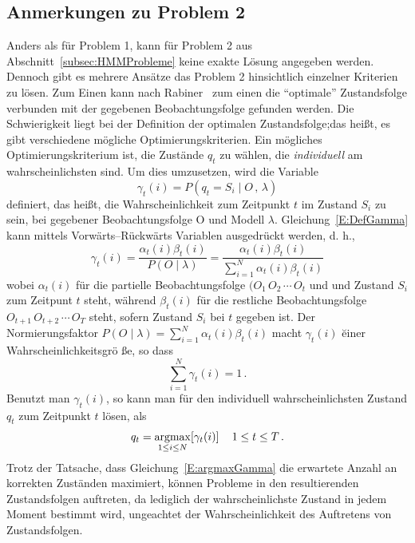 \subsection{Anmerkungen zu Problem 2}
Anders als f\"ur Problem 1, kann f\"ur Problem 2 aus Abschnitt~\ref{subsec:HMMProbleme} keine exakte L\"osung angegeben werden. Dennoch gibt es mehrere Ans\"atze das Problem 2 hinsichtlich einzelner Kriterien zu l\"osen. Zum Einen kann nach Rabiner~\cite{bib:hmmrabiner} zum einen die \enquote{optimale} Zustandsfolge verbunden mit der gegebenen Beobachtungsfolge gefunden werden. Die Schwierigkeit liegt bei der Definition der optimalen Zustandsfolge;das hei\ss t, es gibt verschiedene m\"ogliche Optimierungskriterien. Ein m\"ogliches Optimierungskriterium ist, die Zust\"ande $q_t$ zu w\"ahlen, die \textit{individuell} am wahrscheinlichsten sind. Um dies umzusetzen, wird die Variable
\begin{equation}
\label{E:DefGamma}
\gamma_t(i) = P (q_t = S_i \mid O \, , \, \lambda)
\end{equation}
definiert, das hei\ss t, die Wahrscheinlichkeit zum Zeitpunkt $t$ im Zustand $S_i$ zu sein, bei gegebener Beobachtungsfolge O und Modell $\lambda$. Gleichung~\ref{E:DefGamma} kann mittels Vorw\"arts--R\"uckw\"arts Variablen ausgedr\"uckt werden, d. h.,
\begin{equation}
\label{E:FracGamma}
\gamma_t(i) = \frac{\alpha_t(i) \beta_t(i)}{P (O  \mid \lambda)} = \frac{\alpha_t(i) \beta_t(i)}{\sum_{i = 1}^{N} \alpha_t(i) \beta_t(i)}
\end{equation}
wobei $\alpha_t(i)$ f\"ur die partielle Beobachtungsfolge $(O_1 \, O_2 \, \cdots \, O_t$  und  und Zustand $S_i$ zum Zeitpunt $t$ steht, w\"ahrend $\beta_t(i)$ f\"ur die restliche Beobachtungsfolge $O_{t +1} \, O_{t + 2} \, \cdots \, O_T$ steht, sofern Zustand $S_i$ bei $t$ gegeben ist. Der Normierungsfaktor $P (O  \mid \lambda) = \sum_{i = 1}^{N} \alpha_t(i) \beta_t(i)$ macht $\gamma_t(i)$ \u einer Wahrscheinlichkeitsgr\"o \ss e, so dass 
\begin{equation}
\sum_{i = 1}^{N} \gamma_t(i) = 1 \, .
\end{equation}
Benutzt man $ \gamma_t(i)$, so kann man f\"ur den individuell wahrscheinlichsten Zustand $q_t$ zum Zeitpunkt $t$ l\"osen, als
\begin{align}
\label{E:argmaxGamma}
q_t =  \underset{1 \leq i \leq N}{\operatorname*{argmax}} [\gamma_t(i)] \, & & 1 \leq t \leq T \, .
\end{align}
Trotz der Tatsache, dass Gleichung~\ref{E:argmaxGamma} die erwartete Anzahl an korrekten Zust\"anden maximiert, k\"onnen Probleme in den resultierenden Zustandsfolgen auftreten, da lediglich der wahrscheinlichste Zustand in jedem Moment bestimmt wird, ungeachtet der Wahrscheinlichkeit des Auftretens von Zustandsfolgen.
